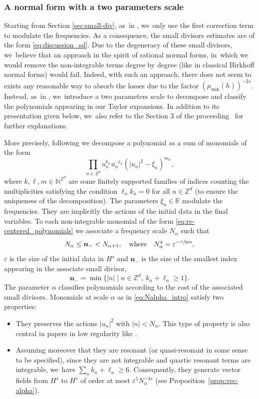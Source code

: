 \documentclass[JEP,XML,SOM,Unicode,published]{cedram}
\theoremstyle{plain}
\theoremstyle{definition}
\newcommand{\nb}{{\boldsymbol n}}
\newcommand{\Z}{\mathbb{Z}}
\newcommand{\R}{\mathbb{R}}
\newcommand{\1}{\mathbf{1}}
\begin{document}
\subsubsection{A normal form with a two parameters scale} \label{sub:fin_de_lintro}
Starting from Section \ref{sec:small-div}, as~in \cite{Bou00}, we~only use the first correction term to modulate the frequencies. As a consequence, the small divisors estimates are of the form \eqref{eq:discussion_sd}. Due to the degeneracy of these small divisors, we~believe that an approach in the spirit of rational normal forms, in~which we would remove the non-integrable terms degree by degree (like in classical Birkhoff normal forms) would fail. Indeed, with such an approach, there does not seem to exists any reasonable way to absorb the losses due to the factor $(\mu_{\min}(h))^{-2s} $.
Instead, as~in \cite{Bou00}, we~introduce a two parameters scale to decompose and classify the polynomials appearing in our Taylor expansions. In addition to its presentation given below, we~also refer to the Section 3 of the proceeding~\cite{C25} for further explanations.

More precisely, following \cite{Bou00} we decompose a polynomial as a sum of monomials of the form
\begin{equation}
\label{eq:re-centered_polynomials}
\prod_{n\in \mathbb{Z}^d} u_{n}^{k_{n}}\overline{u_{n}}^{\ell_{n}}(|u_{n}|^{2} - \xi_n)^{m_n},
\end{equation}
where $k,\ell,m\in \mathbb{N}^{\mathbb{Z}^d}$ are some finitely supported families of indices counting the multiplicities satisfying the condition $\ell_n k_n = 0$ for all $n\in \mathbb{Z}^d$ (to ensure the uniqueness of the decomposition). The parameters $\xi_n\in\R$ modulate the frequencies. They are implicitly the actions of the initial data in the final variables. To each non-integrable monomial of the form \eqref{eq:re-centered_polynomials} we associate a frequency scale $N_{\alpha}$ such that
\begin{equation}
\label{eq:Nalpha_intro}
N_{\alpha} \leq \nb_{-} < N_{\alpha+1}, \quad \mathrm{where} \quad N_\alpha^{s} = \varepsilon^{-\sfrac{\alpha}{200}},
\end{equation}
$\varepsilon$ is the size of the initial data in $H^s$ and $\nb_{-}$ is the size of the smallest index appearing in the associate small divisor, \ie
\[
\nb_{-}=\min\{|n|\mid n\in\Z^{d},\ k_{n}+\ell_{n}\geq1\}.
\]
The parameter $\alpha$ classifies polynomials according to the cost of the associated small divisors. Monomials at scale $\alpha$ as in \eqref{eq:Nalpha_intro} satisfy two properties:
\begin{itemize}
\item They preserves the actions $|u_n|^2$ with $|n|<N_{\alpha}$. This type of property is also central in papers in low regularity like \cite{BGR23}.
\item Assuming moreover that they are resonant (or quasi-resonant in some sense to be specified), since they are not integrable and quartic resonant terms are integrable, we~have $\sum_n k_n +\ell_n \geq 6$. Consequently, they generate vector fields from $H^s$ to $H^s$ of order at most $\varepsilon^{5}N_\alpha^{-4s}$ (see Proposition~\ref{prop:vec-alpha}).
\end{itemize}
\end{document}
